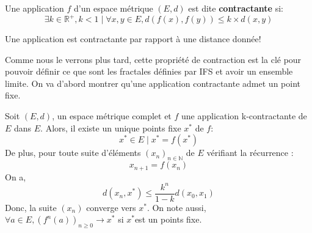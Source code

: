 \documentclass[a4paper, 12pt]{report}
\begin{document}
			\begin{definition}
				Une application $f$ d'un espace métrique $(E,d)$ est dite \textbf{contractante} si:
				\begin{equation}
					\exists k\in\mathds{R}^+, k<1 \mid \forall x,y\in E, d(f(x),f(y))\leqslant k\times d(x,y)
					\label{Pcontractante}
				\end{equation}
			\end{definition}
			
			\begin{remark*}
				Une application est contractante  par rapport à une distance donnée!
			\end{remark*}

			\hspace{.7 cm}Comme nous le verrons plus tard, cette propriété de contraction est la clé pour pouvoir définir ce que sont les fractales définies par IFS et avoir un ensemble limite. On va d'abord montrer qu'une application contractante admet un point fixe.
			
			\begin{theorem}
				\label{ThmPtFixe}
				Soit $(E,d)$, un espace métrique complet et $f$ une application k-contractante de $E$ dans $E$. Alors, il existe un unique points fixe $x^*$ de $f$:
				\begin{equation*}
					x^*\in E\mid x^*=f(x^*)
				\end{equation*}
				De plus, pour toute suite d'éléments $(x_n)_{n\in\mathds{N}}$ de $E$ vérifiant la récurrence :
				\begin{equation*}
					x_{n+1}=f(x_n)
				\end{equation*}
				On a,
				\begin{equation}
					d(x_n,x^*)\leq \frac{k^n}{1-k} d(x_0,x_1)
				\end{equation}
				Donc, la suite $(x_n)$ converge vers $x^*$.
				On note aussi, $\forall a\in E,(f^n(a))_{n\geq 0}\longrightarrow x^*$ si $x^*$est un points fixe.
			\end{theorem}
\end{document}
